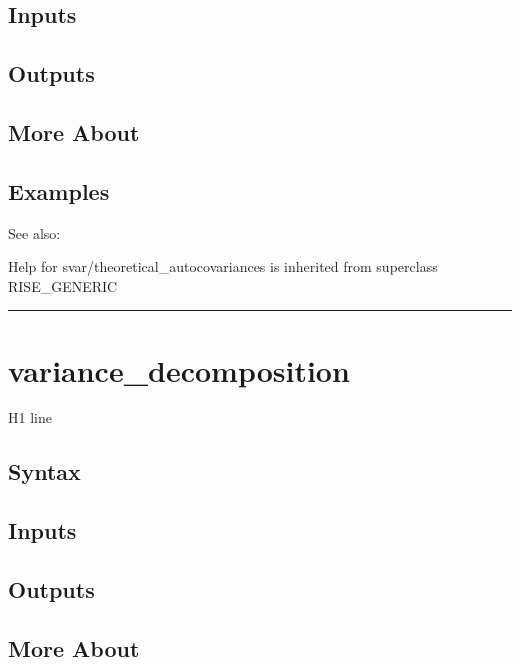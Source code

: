 \documentclass[letterpaper,10pt,english]{sphinxmanual}
\begin{document}
\subsection{Inputs}
\label{classes/models/@svar/svar:id167}

\subsection{Outputs}
\label{classes/models/@svar/svar:id168}

\subsection{More About}
\label{classes/models/@svar/svar:id169}

\subsection{Examples}
\label{classes/models/@svar/svar:id170}
See also:

Help for svar/theoretical\_autocovariances is inherited from superclass RISE\_GENERIC


\bigskip\hrule{}\bigskip



\section{variance\_decomposition}
\label{classes/models/@svar/svar:variance-decomposition}\label{classes/models/@svar/svar:id171}
H1 line


\subsection{Syntax}
\label{classes/models/@svar/svar:id172}

\subsection{Inputs}
\label{classes/models/@svar/svar:id173}

\subsection{Outputs}
\label{classes/models/@svar/svar:id174}

\subsection{More About}
\label{classes/models/@svar/svar:id175}
\end{document}
